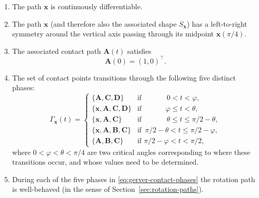 \documentclass[11pt]{article}
\newcommand{\contact}{\Gamma}
\begin{document}
\begin{enumerate}

\item The path $\mathbf{x}$ is continuously differentiable.
\item The path $\mathbf{x}$ (and therefore also the associated shape $S_{\mathbf{x}}$) has a left-to-right symmetry around the vertical axis passing through its midpoint $\mathbf{x}(\pi/4)$.
\item The associated contact path $\mathbf{A}(t)$ satisfies 
\begin{equation} \label{eq:gerver-assumptionA}
\mathbf{A}(0)=(1,0)^\top.
\end{equation}
\item The set of contact points transitions through the following five distinct phases:
\begin{equation} \label{eq:gerver-contact-phases}
\contact_{\mathbf{x}}(t) = \begin{cases}
\{ \mathbf{A}, \mathbf{C}, \mathbf{D} \} & \textrm{if }\phantom{\pi/2-\ \,}0< t< \varphi, \\
\{ \mathbf{x}, \mathbf{A}, \mathbf{C}, \mathbf{D} \} & \textrm{if }\phantom{\pi/2-\ }\varphi \le t < \theta, \\
\{ \mathbf{x}, \mathbf{A}, \mathbf{C} \}& \textrm{if }\phantom{\pi/2-\ \,}\theta \le t \le \pi/2-\theta, \\
\{ \mathbf{x}, \mathbf{A}, \mathbf{B}, \mathbf{C} \}& \textrm{if }\, \pi/2-\theta < t \le \pi/2-\varphi, \\
\{ \mathbf{A}, \mathbf{B}, \mathbf{C} \} & \textrm{if } \pi/2-\varphi < t < \pi/2,
\end{cases}
\end{equation}
where $0<\varphi<\theta<\pi/4$ are two critical angles corresponding to where these transitions occur, and whose values need to be determined. 

\item During each of the five phases in \eqref{eq:gerver-contact-phases} the rotation path is well-behaved (in the sense of Section~\ref{sec:rotation-paths}).
\end{enumerate}
\end{document}
